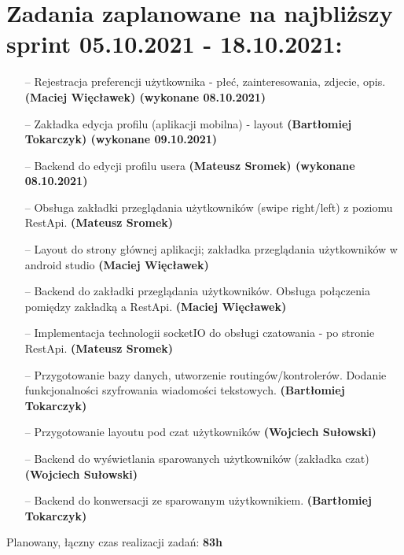 \documentclass[12pt,a4paper]{article}
\begin{document}
\section{Zadania zaplanowane na najbliższy sprint 05.10.2021 - 18.10.2021: }
\begin{itemize}
   \item [--] Rejestracja preferencji użytkownika - płeć, zainteresowania, zdjecie, opis. \textbf{(Maciej Więcławek) (wykonane 08.10.2021)}
 \item [--]Zakładka edycja profilu (aplikacji mobilna) - layout \textbf{(Bartłomiej Tokarczyk) (wykonane 09.10.2021)}

  \item [--]Backend do edycji profilu usera\textbf{ (Mateusz Sromek) (wykonane 08.10.2021)}

   \item [--]Obsługa zakładki przeglądania użytkowników (swipe right/left) z poziomu RestApi. \textbf{(Mateusz Sromek)}

    \item [--]Layout do strony głównej aplikacji; zakładka przeglądania użytkowników w android studio \textbf{(Maciej Więcławek)}

     \item [--]Backend do zakładki przeglądania użytkowników. Obsługa połączenia pomiędzy zakładką a RestApi.\textbf{ (Maciej Więcławek)}

      \item [--]Implementacja technologii socketIO do obsługi czatowania - po stronie RestApi. \textbf{(Mateusz Sromek)}
      
      \item [--]Przygotowanie bazy danych, utworzenie routingów/kontrolerów. Dodanie funkcjonalności szyfrowania wiadomości tekstowych.\textbf{ (Bartłomiej Tokarczyk) }

      \item [--]Przygotowanie layoutu pod czat użytkowników\textbf{ (Wojciech Sułowski) }

      \item [--]Backend do wyświetlania sparowanych użytkowników (zakładka czat) \textbf{(Wojciech Sułowski)}
      
 \item [--]Backend do konwersacji ze sparowanym użytkownikiem. \textbf{(Bartłomiej Tokarczyk)}

\end{itemize}

Planowany, łączny czas realizacji zadań:\textbf{ 83h}
\end{document}
